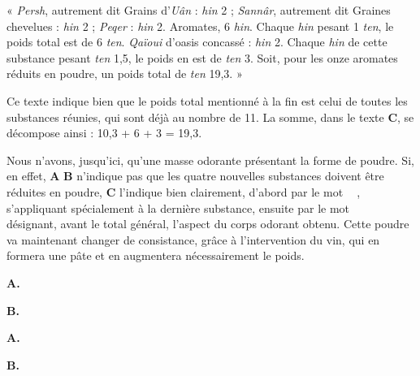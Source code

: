 \documentclass[a4paper, 11pt, oneside]{article}
\newcommand*\hieroAAAL{}
\newcommand*\hieroAAAM{}
\newcommand*\hieroAABB{}
\newcommand*\hieroAABE{}
\newcommand*\hieroAACY{}
\newcommand*\hieroAADL{}
\newcommand*\hieroAADS{}
\newcommand*\hieroAAEM{}
\newcommand*\hieroAAFI{}
\newcommand*\hieroAAFT{}
\newcommand*\hieroAAGA{}
\newcommand*\hieroAAGN{}
\newcommand*\hieroAAGP{}
\newcommand*\hieroAAHW{}
\newcommand*\hieroAAII{}
\newcommand*\hieroAAIT{}
\newcommand*\hieroAAIW{}
\newcommand*\hieroAAJA{}
\newcommand*\hieroAAJB{}
\newcommand*\hieroAALI{}
\newcommand*\hieroAALK{}
\newcommand*\hieroAALL{}
\newcommand*\hieroAALM{}
\newcommand*\hieroAALN{}
\newcommand*\hieroAALO{}
\newcommand*\hieroAALP{}
\newcommand*\hieroAALQ{}
\newcommand*\hieroAALR{}
\newcommand*\hieroAALS{\raisebox{0.6ex}{}}
\newcommand*\hieroAALT{}
\newcommand*\hieroAALU{}
\newcommand*\hieroAALV{}
\newcommand*\hieroAALW{}
\newcommand*\hieroAALX{}
\newcommand*\hieroAALY{}
\newcommand*\hieroAALZ{}
\newcommand*\hieroAAMA{}
\newcommand*\hieroAAMB{}
\newcommand*\hieroAAMC{}
\newcommand*\hieroAAMD{}
\newcommand*\hieroAAME{}
\newcommand*\hieroAAMF{}
\newcommand*\hieroAAMG{}
\newcommand*\hieroAAMH{}
\newcommand*\hieroAAMI{}
\newcommand*\hieroAAMJ{}
\newcommand*\hieroAAMK{}
\newcommand*\hieroAAML{}
\begin{document}
« \emph{Persh}, autrement dit Grains d'\emph{Uân} : \emph{hin} 2 ; \emph{Sannâr}, autrement dit Graines chevelues : \emph{hin} 2 ; \emph{Peqer} : \emph{hin} 2. Aromates, 6 \emph{hin}. Chaque \emph{hin} pesant 1 \emph{ten}, le poids total est de 6 \emph{ten}. \emph{Qaïoui} d'oasis concassé : \emph{hin} 2. Chaque \emph{hin} de cette substance pesant \emph{ten} 1,5, le poids en est de \emph{ten} 3. Soit, pour les onze aromates réduits en poudre, un poids total de \emph{ten} 19,3. »

Ce texte indique bien que le poids total mentionné à la fin est celui de toutes les substances réunies, qui sont déjà au nombre de 11. La somme, dans le texte \textbf{C}, se décompose ainsi : 10,3 + 6 + 3 = 19,3.

Nous n'avons, jusqu'ici, qu'une masse odorante présentant la forme de poudre. Si, en effet, \textbf{A} \textbf{B} n'indique pas que les quatre nouvelles substances doivent être réduites en poudre, \textbf{C} l'indique bien clairement, d'abord par le mot $\hieroAADS\:\hieroAALK\:\hieroAADS\:\hieroAALK\:\hieroAALL$, s'appliquant spécialement à la dernière substance, ensuite par le mot $\hieroAAGP\:\hieroAACY\:\hieroAAAM\:\hieroAAAM\:\hieroAAHW$ désignant, avant le total général, l'aspect du corps odorant obtenu. Cette poudre va maintenant changer de consistance, grâce à l'intervention du vin, qui en formera une pâte et en augmentera nécessairement le poids.

\hspace*{10mm}\textbf{A.}\hspace*{5mm} $\hieroAALM\:\hieroAALN\:\hieroAALO\:\hieroAAIT\:\hieroAALP$ \hspace*{16mm} $\hieroAAFI\:\hieroAALQ\:\hieroAALR\:\hieroAALS\:\hieroAAAM\:\hieroAAAL$

\hspace*{10mm}\textbf{B.}\hspace*{5mm} $\hieroAALT\:\hieroAAAM\:\hieroAAAM\:\hieroAALU\:\hieroAAAM\:\hieroAALV\:\hieroAALO\:\hieroAAGN\:\hieroAAFT\:\hieroAALP$ \hspace*{2mm} $\hieroAAFI\:\hieroAADL\:\hieroAALW\:\hieroAAAM\:\hieroAALX\:\hieroAAAM\:\hieroAAAL\:\hieroAALY$

\hspace*{10mm}\textbf{A.}\hspace*{5mm} $\hieroAABB\:\hieroAALZ\:\hieroAABE\:\hieroAAMA\:\hieroAAMB\:\hieroAAMC\:\hieroAAMD\:\hieroAAME\:\hieroAAAM\:\hieroAAII\:\hieroAAMF\:\hieroAALI\:\hieroAAGA\:\hieroAAMG$

\hspace*{10mm}\textbf{B.}\hspace*{5mm} $\hieroAAMH\:\hieroAAEM\:\hieroAADS\:\hieroAAAM\:\hieroAAAM\:\hieroAAMI\:\hieroAAAM\:\hieroAAMJ\:\hieroAAMC\:\hieroAAMK\:\hieroAAIW\:\hieroAAAM\:\hieroAALV\:\hieroAALI\:\hieroAAJA\:\hieroAAJB\:\hieroAAML$
\end{document}

